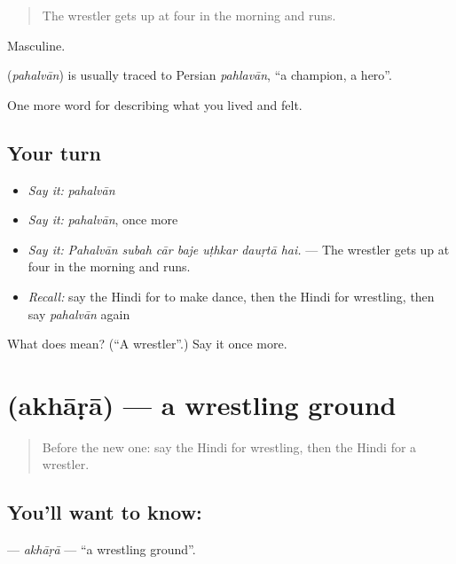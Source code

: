\begin{quote}
The wrestler gets up at four in the morning and runs.
\end{quote}

Masculine.

\begin{cousinweb}
\textbf{} (\emph{pahalvān}) is usually traced to Persian \emph{pahlavān}, \textquotedblleft{}a champion, a hero\textquotedblright{}.
\end{cousinweb}

\begin{grammarlens}[title={What you've built}]
One more word for describing what you lived and felt.
\end{grammarlens}

\subsection*{Your turn}
\begin{itemize}
\raggedright
  \item \emph{Say it:} \emph{pahalvān}
  \item \emph{Say it:} \emph{pahalvān}, once more
  \item \emph{Say it:} \emph{Pahalvān subah cār baje uṭhkar dauṛtā hai.} — The wrestler gets up at four in the morning and runs.
  \item \emph{Recall:} say the Hindi for to make dance, then the Hindi for wrestling, then say \emph{pahalvān} again
\end{itemize}

\begin{tcolorbox}[breakable,colback=teal!4,colframe=teal!35!black,title={Before you move on}]
What does  mean? (\textquotedblleft{}A wrestler\textquotedblright{}.) Say it once more.
\end{tcolorbox}
\section[\texorpdfstring{\hi{अखाड़ा} (akhāṛā)}{अखाड़ा (akhāṛā)}]{ (akhāṛā) — a wrestling ground}

\label{lesson:HI-C533-akhara}



\begin{quote}
Before the new one: say the Hindi for wrestling, then the Hindi for a wrestler.
\end{quote}

\subsection*{You'll want to know: }
\textbf{} — \emph{akhāṛā} — \textquotedblleft{}a wrestling ground\textquotedblright{}.

